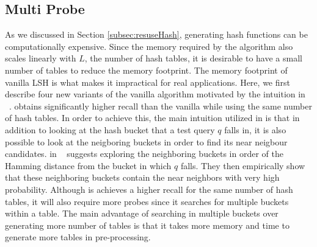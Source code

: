 \subsection{Multi Probe \lsh}
\label{sec:mblsh}
As we discussed in Section \ref{subsec:resuseHash}, generating hash functions can be computationally expensive.
Since the memory required by the algorithm also scales linearly with $L$, the number of hash tables, it is desirable to have a small 
number of tables to reduce the memory footprint. The memory footprint of vanilla LSH is what makes it impractical for real applications. 
Here, we first describe four new variants of the vanilla \lsh algorithm motivated by the intuition in
\mblshf~\cite{LvVLDB07}. \mblshf obtains significantly higher recall than the vanilla \lsh while using
the same number of hash tables. In order to achieve this, the main intuition utilized in \mblshf is that
in addition to looking at the hash bucket that a test query $q$ falls in, it is also possible to look at the neigboring buckets
in order to find its near neigbour candidates. \mblshf in ~\cite{LvVLDB07} suggests exploring the neighboring buckets in order of the
Hamming distance from the bucket in which $q$ falls. They then empirically show that these neighboring buckets contain 
the near neighbors with very high probability. 
Although \mblshf is achieves a higher recall for the same number of hash tables, it will also require more 
probes since it searches for multiple buckets within a table. 
The main advantage of searching in multiple buckets over generating more number of tables 
is that it takes more memory and time to generate more tables in pre-processing. 

